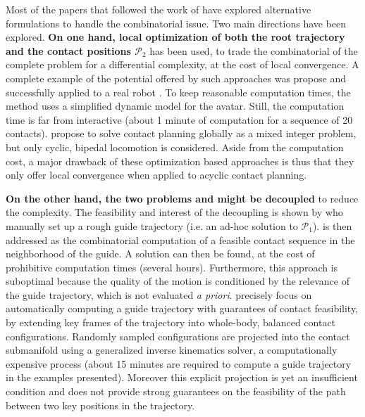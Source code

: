 Most of the papers that followed the work of \citeauthor{conf/iser/BretlRLKA04} have explored alternative formulations to handle the combinatorial issue. Two main directions have been explored. \textbf{On one hand, local optimization of both the root trajectory \Pa and the contact positions $\mathcal{P}_2$} has been used, to trade the combinatorial of the complete problem for a differential complexity, at the cost of local convergence. A complete example of the potential offered by such approaches was propose \citep{Mordatch:2012:DCB:2185520.2185539} and successfully applied to a real robot \citep{mordatch2015}. To keep reasonable computation times, the method uses a simplified dynamic model for the avatar. Still, the computation time is far from interactive  (about 1 minute of computation for a sequence of 20 contacts). \citeauthor{DBLP:conf/humanoids/DeitsT14} propose to solve contact planning globally as a mixed integer problem, but only cyclic, bipedal locomotion is considered. Aside from the computation cost, a major drawback of these optimization based approaches is thus that they only offer local convergence when applied to acyclic contact planning.

\textbf{On the other hand, the two problems \Pa and \Pb might be decoupled} to reduce the complexity. The feasibility and interest of the decoupling is shown by \citeauthor{DBLP:conf/iser/EscandeKMG08} who manually set up a rough guide trajectory (i.e. an ad-hoc solution to $\mathcal{P}_1$). \Pb  is then addressed as the combinatorial computation of a feasible contact sequence in the neighborhood of the guide. A solution can then be found, at the cost of prohibitive computation times (several hours). Furthermore, this approach is suboptimal because the quality of the motion is conditioned by the relevance of the guide trajectory,  which is not evaluated \textit{a priori}. \citeauthor{Bouyarmane2009} precisely focus on automatically computing a guide trajectory with guarantees of contact feasibility, by extending key frames of the trajectory into whole-body, balanced contact configurations. Randomly sampled configurations are projected into the contact submanifold using a generalized inverse kinematics solver, a computationally expensive process (about 15 minutes are required to compute a guide trajectory in the examples presented). Moreover this explicit projection is yet an insufficient condition and does not provide strong guarantees on the feasibility of the path between two key positions in the trajectory.
 

